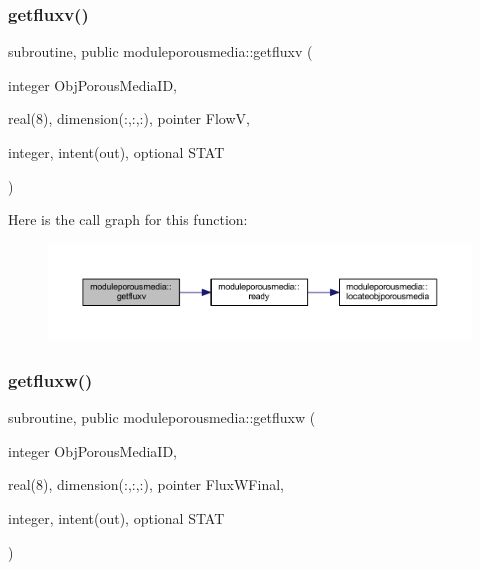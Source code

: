 \subsubsection{\texorpdfstring{getfluxv()}{getfluxv()}}
{\footnotesize\ttfamily subroutine, public moduleporousmedia\+::getfluxv (\begin{DoxyParamCaption}\item[{integer}]{Obj\+Porous\+Media\+ID,  }\item[{real(8), dimension(\+:,\+:,\+:), pointer}]{FlowV,  }\item[{integer, intent(out), optional}]{S\+T\+AT }\end{DoxyParamCaption})}

Here is the call graph for this function\+:\nopagebreak
\begin{figure}[H]
\begin{center}
\leavevmode
\includegraphics[width=350pt]{namespacemoduleporousmedia_a7232e9ac88cf3c92c636f7432acbec07_cgraph}
\end{center}
\end{figure}
\mbox{\label{namespacemoduleporousmedia_a5f6e92f6c7e21ae5b9a8b35203c299c7}} 
\subsubsection{\texorpdfstring{getfluxw()}{getfluxw()}}
{\footnotesize\ttfamily subroutine, public moduleporousmedia\+::getfluxw (\begin{DoxyParamCaption}\item[{integer}]{Obj\+Porous\+Media\+ID,  }\item[{real(8), dimension(\+:,\+:,\+:), pointer}]{Flux\+W\+Final,  }\item[{integer, intent(out), optional}]{S\+T\+AT }\end{DoxyParamCaption})}

